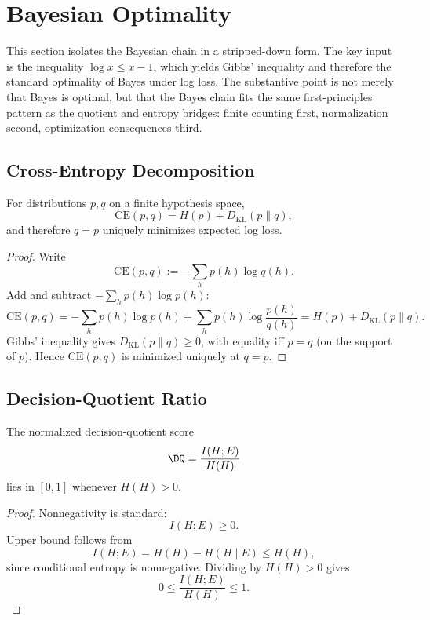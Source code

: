 \section{Bayesian Optimality}\label{sec:bayesian-optimality}

This section isolates the Bayesian chain in a stripped-down form. The key input is the inequality $\log x \le x - 1$, which yields Gibbs' inequality and therefore the standard optimality of Bayes under log loss. The substantive point is not merely that Bayes is optimal, but that the Bayes chain fits the same first-principles pattern as the quotient and entropy bridges: finite counting first, normalization second, optimization consequences third.

\subsection{Cross-Entropy Decomposition}

\begin{theorem}\label{thm:bayes-optimal}
For distributions $p,q$ on a finite hypothesis space,
\[
\mathrm{CE}(p,q)=H(p)+D_{\mathrm{KL}}(p\|q),
\]
and therefore $q=p$ uniquely minimizes expected log loss.
\end{theorem}

\begin{proof}
Write
\[
\mathrm{CE}(p,q):=-\sum_h p(h)\log q(h).
\]
Add and subtract $-\sum_h p(h)\log p(h)$:
\[
\mathrm{CE}(p,q)
=-\sum_h p(h)\log p(h)+\sum_h p(h)\log\frac{p(h)}{q(h)}
=H(p)+D_{\mathrm{KL}}(p\|q).
\]
Gibbs' inequality gives $D_{\mathrm{KL}}(p\|q)\ge 0$, with equality iff $p=q$ (on the support of $p$). Hence $\mathrm{CE}(p,q)$ is minimized uniquely at $q=p$.
\end{proof}

\subsection{Decision-Quotient Ratio}

\begin{proposition}\label{prop:dq-range}
The normalized decision-quotient score
\[
\DQ = \frac{I(H;E)}{H(H)}
\]
lies in $[0,1]$ whenever $H(H)>0$.
\end{proposition}

\begin{proof}
Nonnegativity is standard:
\[
I(H;E)\ge 0.
\]
Upper bound follows from
\[
I(H;E)=H(H)-H(H\mid E)\le H(H),
\]
since conditional entropy is nonnegative. Dividing by $H(H)>0$ gives
\[
0\le \frac{I(H;E)}{H(H)}\le 1.
\]
\end{proof}

